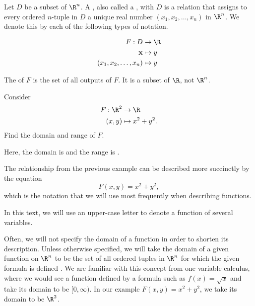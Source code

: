 \documentclass{ximera}
\newcommand{\point}[1]{\left(#1\right)} %
\newcommand{\pt}[1]{\mathbf{#1}} %
\begin{document}
\begin{definition}
  Let $D$ be a subset of $\R^n$.  A , also called a , with  $D$ is a relation that assigns to
  every ordered $n$-tuple in $D$ a unique real number $\point{x_1, x_2, \dots, x_n}$ in $\R^n$.  We
  denote this by each of the following types of notation.

  \begin{align*}
    F: D &\to \R\\
    \pt{x} &\mapsto y\\
    \point{x_1,x_2,\dots,x_n} &\mapsto y
  \end{align*}
  
  The  of $F$ is the set of all outputs of $F$.  It is a
  subset of $\R$, not $\R^n$.
\end{definition}

\begin{example}
  Consider
  \begin{align*}
    F: \R^2 &\to \R\\
    (x,y) &\mapsto x^2+y^2.
  \end{align*}
  Find the domain and range of $F$.
  \begin{explanation}
    Here, the domain is 
    and the range is \wordChoice{\choice{$(-\infty,\infty)$}\choice[correct]{$[0,\infty)$}\choice{$\R^2$}\choice{$\R^n$}}.
  \end{explanation}
\end{example}
The relationship from the previous example can be described more
succinctly by the equation
\[
F(x,y)=x^2+y^2,
\]
which is the notation that we will use most frequently 
when describing functions.

\begin{remark}
  In this text, we will use an upper-case letter to denote a function
  of several variables.
\end{remark}

  Often, we will not specify the domain of a function in order to
  shorten its description.  Unless otherwise specified, we will take the
  domain of a given function on $\R^n$ to be the set of all ordered
  tuples in $\R^n$ for which the given formula is defined .  We are familiar with this 
  concept from one-variable calculus, where we would see a function defined by a formula such as 
  $f(x) = \sqrt{x}$ and take its domain to be $[0, \infty)$.  In our example
 $F(x,y) = x^2+y^2$, we take its domain to be $\R^2$.
\end{document}

